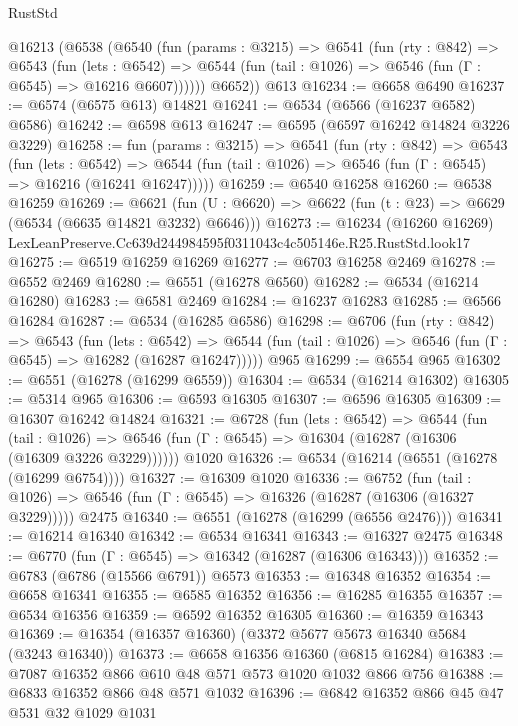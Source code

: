 \begin{lexlean}{RustStd}
\begin{coremodule}
    @16213
      (@6538
        (@6540
          (fun (params : @3215) =>
          @6541
            (fun (rty : @842) =>
            @6543
              (fun (lets : @6542) =>
              @6544 (fun (tail : @1026) => @6546 (fun (Γ : @6545) => @16216 @6607))))))
        @6652))
    @613
@16234 := @6658 @6490
@16237 := @6574 (@6575 @613) @14821
@16241 := @6534 (@6566 (@16237 @6582) @6586)
@16242 := @6598 @613
@16247 := @6595 (@6597 @16242 @14824 @3226 @3229)
@16258 := fun (params : @3215) =>
  @6541
    (fun (rty : @842) =>
    @6543
      (fun (lets : @6542) =>
      @6544 (fun (tail : @1026) => @6546 (fun (Γ : @6545) => @16216 (@16241 @16247)))))
@16259 := @6540 @16258
@16260 := @6538 @16259
@16269 := @6621
    (fun (U : @6620) => @6622 (fun (t : @23) => @6629 (@6534 (@6635 @14821 @3232) @6646)))
@16273 := @16234
    (@16260 @16269)
    LexLeanPreserve.Cc639d244984595f0311043c4c505146e.R25.RustStd.look17
@16275 := @6519 @16259 @16269
@16277 := @6703 @16258 @2469
@16278 := @6552 @2469
@16280 := @6551 (@16278 @6560)
@16282 := @6534 (@16214 @16280)
@16283 := @6581 @2469
@16284 := @16237 @16283
@16285 := @6566 @16284
@16287 := @6534 (@16285 @6586)
@16298 := @6706
    (fun (rty : @842) =>
    @6543
      (fun (lets : @6542) =>
      @6544 (fun (tail : @1026) => @6546 (fun (Γ : @6545) => @16282 (@16287 @16247)))))
    @965
@16299 := @6554 @965
@16302 := @6551 (@16278 (@16299 @6559))
@16304 := @6534 (@16214 @16302)
@16305 := @5314 @965
@16306 := @6593 @16305
@16307 := @6596 @16305
@16309 := @16307 @16242 @14824
@16321 := @6728
    (fun (lets : @6542) =>
    @6544
      (fun (tail : @1026) =>
      @6546 (fun (Γ : @6545) => @16304 (@16287 (@16306 (@16309 @3226 @3229))))))
    @1020
@16326 := @6534 (@16214 (@6551 (@16278 (@16299 @6754))))
@16327 := @16309 @1020
@16336 := @6752
    (fun (tail : @1026) => @6546 (fun (Γ : @6545) => @16326 (@16287 (@16306 (@16327 @3229)))))
    @2475
@16340 := @6551 (@16278 (@16299 (@6556 @2476)))
@16341 := @16214 @16340
@16342 := @6534 @16341
@16343 := @16327 @2475
@16348 := @6770 (fun (Γ : @6545) => @16342 (@16287 (@16306 @16343)))
@16352 := @6783 (@6786 (@15566 @6791)) @6573
@16353 := @16348 @16352
@16354 := @6658 @16341
@16355 := @6585 @16352
@16356 := @16285 @16355
@16357 := @6534 @16356
@16359 := @6592 @16352 @16305
@16360 := @16359 @16343
@16369 := @16354 (@16357 @16360) (@3372 @5677 @5673 @16340 @5684 (@3243 @16340))
@16373 := @6658 @16356 @16360 (@6815 @16284)
@16383 := @7087 @16352 @866 @610 @48 @571 @573 @1020 @1032 @866 @756
@16388 := @6833 @16352 @866 @48 @571 @1032
@16396 := @6842 @16352 @866 @45 @47 @531 @32 @1029 @1031

\end{coremodule}
\end{lexlean}
